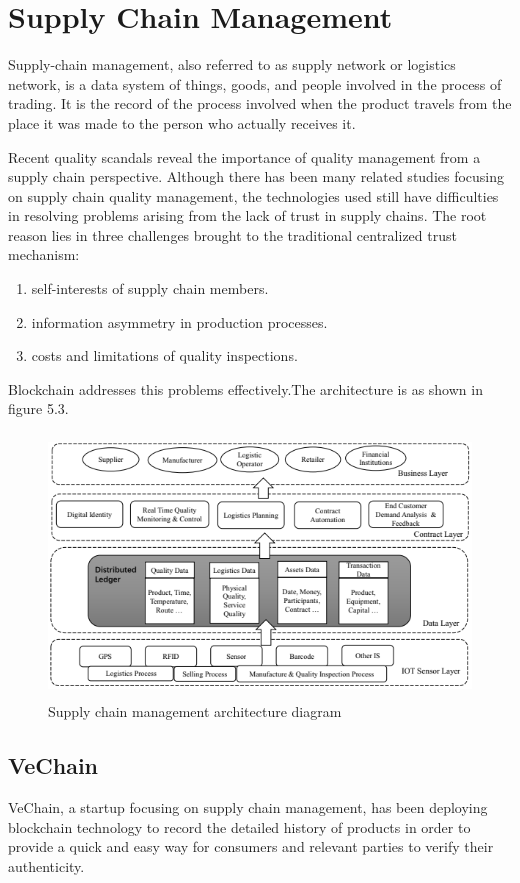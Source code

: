 \documentclass[12pt]{report}
\begin{document}
\section{Supply Chain Management}
\par Supply-chain management, also referred to as supply network or logistics network, is a data system of things, goods, and people involved in the process of trading. It is the record of the process involved when the product travels from the place it was made to the person who actually receives it.
\par Recent quality scandals reveal the importance of
quality management from a supply chain perspective.
Although there has been many related studies focusing on
supply chain quality management, the technologies used still
have difficulties in resolving problems arising from the lack of
trust in supply chains. The root reason lies in three challenges
brought to the traditional centralized trust mechanism:
\begin{enumerate}
\item self-interests of supply chain members.
\item information asymmetry in production processes.
\item costs and limitations of quality inspections.
\end{enumerate}
\par Blockchain addresses this problems effectively.The architecture is as shown in figure 5.3.
\begin{figure}
    \centering
    \includegraphics[width=14cm,height=7cm]{supply_chain.png}
    \caption{Supply chain management architecture diagram}
    \label{fig:my_label}
\end{figure}
\subsection{VeChain}
\par VeChain, a startup focusing on supply chain management, has been deploying blockchain technology to record the detailed history of products in order to provide a quick and easy way for consumers and relevant parties to verify their authenticity.
\end{document}

